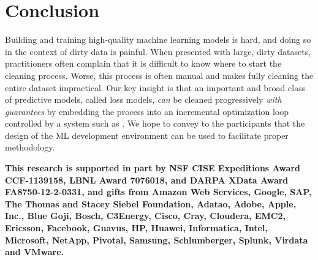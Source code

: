 \section{Conclusion}
Building and training high-quality machine learning models is hard, and doing so in the context of dirty data is painful.
When presented with large, dirty datasets, practitioners often complain that it is difficult to know where to start the cleaning process.
Worse, this process is often manual and makes fully cleaning the entire dataset impractical.  
Our key insight is that an important and broad class of predictive models, called loss models, 
{\it can} be cleaned progressively {\it with guarantees} by embedding the process into an incremental optimization loop controlled by a system such as \sys.
We hope to convey to the participants that the design of the ML development environment can be used to facilitate proper methodology.

\vspace{0.5em}

\textbf{\scriptsize This research is supported in part by NSF CISE Expeditions Award CCF-1139158, LBNL Award 7076018, and DARPA XData Award FA8750-12-2-0331, and gifts from Amazon Web Services, Google, SAP, The Thomas and Stacey Siebel Foundation, Adatao, Adobe, Apple, Inc., Blue Goji, Bosch, C3Energy, Cisco, Cray, Cloudera, EMC2, Ericsson, Facebook, Guavus, HP, Huawei, Informatica, Intel, Microsoft, NetApp, Pivotal, Samsung, Schlumberger, Splunk, Virdata and VMware.}
